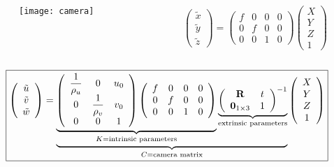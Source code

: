 \begin{frame}
\footnotesize
\begin{columns}
\begin{column}{.5\textwidth}
\begin{figure}[!h]
\centering
\texttt{[image: camera]}
\end{figure}
\end{column}
\begin{column}{.5\textwidth}
\[
\left (
\begin{array}{c}
\tilde{x}\\
\tilde{y}\\
\tilde{z}
\end{array}
\right )
=
\left (
\begin{array}{cccc}
f & 0 & 0 & 0 \\
0 & f & 0 & 0 \\
0 & 0 & 1 & 0
\end{array}
\right )
\left (
\begin{array}{c}
X \\
Y \\
Z \\
1
\end{array}
\right )
\]
\end{column}
\end{columns}
\[
\boxed{
\left (
\begin{array}{c}
\tilde{u} \\
\tilde{v} \\
\tilde{w}
\end{array}
\right )
=
\underbrace{
\underbrace{
\left (
\begin{array}{ccc}
\dfrac{1}{\rho_u} & 0 & u_{0} \\
0 & \dfrac{1}{\rho_v} & v_{0} \\
0 & 0 & 1
\end{array}
\right )
\left (
\begin{array}{cccc}
f & 0 & 0 & 0 \\
0 & f & 0 & 0 \\
0 & 0 & 1 & 0
\end{array}
\right )
}_{K=\text{intrinsic parameters}}
\underbrace{
\left (
\begin{array}{cc}
\textbf{\text{R}} & t \\
\textbf{\text{0}}_{1\times 3} & 1
\end{array}
\right )^{-1}
}_{\text{extrinsic parameters}}
}_{C = \text{camera matrix}}
\left (
\begin{array}{c}
X \\
Y \\
Z \\
1
\end{array}
\right )
}
\]
\end{frame}

